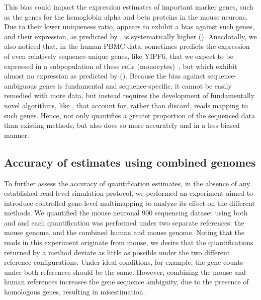 This bias could impact the expression estimates of important marker genes, such as the genes for the hemoglobin alpha and beta proteins in the mouse neurons\citep{han2018mapping, richter2009neurons}. Due to their lower uniqueness ratio, \cellr appears to exhibit a bias against such genes, and their expression, as predicted by \alevin, is systematically higher ().  Anecdotally, we also noticed that, in the human PBMC data, \alevin sometimes predicts the expression of even relatively sequence-unique genes, like YIPF6, that we expect to be expressed in a subpopulation of these cells (monocytes)~\citep{yipf6}, but which exhibit almost no expression as predicted by \cellr ().  Because the bias against sequence-ambiguous genes is fundamental and sequence-specific, it cannot be easily remedied with more data, but instead requires the development of fundamentally novel algorithms, like \alevin, that account for, rather than discard, reads mapping to such genes. Hence, \alevin not only quantifies a greater proportion of the sequenced data than existing methods, but also does so more accurately and in a less-biased manner.

\subsection{Accuracy of estimates using combined genomes}
To further assess the accuracy of quantification estimates, in the absence of
  any established read-level simulation protocol, we performed an experiment aimed
  to introduce controlled gene-level multimapping to analyze its effect on the
  different methods.  We quantified the mouse neuronal 900 sequencing dataset
  using both \cellr and \alevin and each quantification was performed under
  two separate references: the mouse genome, and the combined human and mouse genome.
  Noting that the reads in this experiment originate from mouse, we
  desire that the quantifications returned by a method deviate as little as
  possible under the two different reference configurations. Under ideal
  conditions, for example, the gene counts under both references should be the
  same. However, combining the mouse and human references increases the gene
  sequence ambiguity, due to the presence of homologous genes, resulting in
  misestimation. 
  
